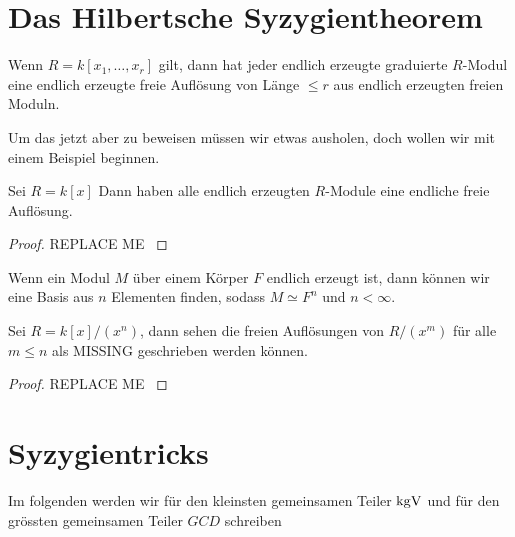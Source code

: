 \documentclass{article}
\begin{document}
\section{Das Hilbertsche Syzygientheorem}
	\begin{thm}
		Wenn 
		\( R = k \left[ x_1,\dots,x_r \right] \)
		gilt,
		dann hat jeder endlich erzeugte graduierte 
		\(R \)-Modul 
		eine endlich erzeugte freie Aufl\"osung von L\"ange 
		\( \le r \) 
		aus endlich erzeugten freien Moduln.
	\end{thm}
	Um das jetzt aber zu beweisen m\"ussen wir etwas ausholen, 
	doch wollen wir mit einem Beispiel beginnen.
	\begin{bsp}[\nocite{Eis1}{Exercise 1.22}]
		Sei 
		\( R = k\left[ x \right] \)
		Dann haben alle endlich erzeugten 
		\(R\)-Module 
		eine endliche freie Aufl\"osung.
		\begin{proof}
			{\color{red} REPLACE ME }		
		\end{proof}
	\end{bsp}	
	\begin{thm}
		Wenn ein Modul 
		\( M \)
		\"uber einem K\"orper 
		\( F \) 
		endlich erzeugt ist, 
		dann k\"onnen wir eine Basis aus
		\( n \) 
		Elementen finden,
		sodass 
		\(
			M \simeq F^{n} 
		\)
		und 
		\( n < \infty \).
	\end{thm}
	\begin{bsp}
		Sei 
		\( R= k\left[ x \right] \big/ \left( x^{n} \right) \),
		dann sehen die freien Aufl\"osungen von 
		\( R\big/ \left( x^{m} \right) \) 
		f\"ur alle 
		\( m \le n \)
		als 
		{\color{red}MISSING}
		geschrieben werden k\"onnen.
		\begin{proof}
			{\color{red} REPLACE ME }
		\end{proof}
	\end{bsp}
\section{Syzygientricks}
	\begin{defn}
		Im folgenden werden wir f\"ur den kleinsten gemeinsamen Teiler
		\( \operatorname{kgV} \)
		und f\"ur den gr\"ossten gemeinsamen Teiler
		\( GCD \)
		schreiben
	\end{defn}
\end{document}
